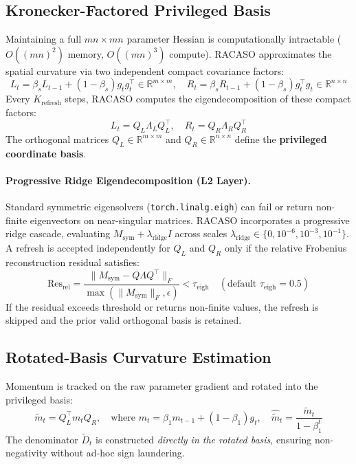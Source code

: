 \documentclass[11pt,a4paper]{article}
\begin{document}
\subsection{Kronecker-Factored Privileged Basis}

Maintaining a full $mn \times mn$ parameter Hessian is computationally intractable ($O((mn)^2)$ memory, $O((mn)^3)$ compute). RACASO approximates the spatial curvature via two independent compact covariance factors:
\begin{equation}
L_t = \beta_s L_{t-1} + (1 - \beta_s) g_t g_t^\top \in \mathbb{R}^{m \times m}, \quad R_t = \beta_s R_{t-1} + (1 - \beta_s) g_t^\top g_t \in \mathbb{R}^{n \times n}
\end{equation}
Every $K_{\text{refresh}}$ steps, RACASO computes the eigendecomposition of these compact factors:
\begin{equation}
L_t = Q_L \Lambda_L Q_L^\top, \quad R_t = Q_R \Lambda_R Q_R^\top
\end{equation}
The orthogonal matrices $Q_L \in \mathbb{R}^{m \times m}$ and $Q_R \in \mathbb{R}^{n \times n}$ define the \textbf{privileged coordinate basis}.

\paragraph{Progressive Ridge Eigendecomposition (L2 Layer).}
Standard symmetric eigensolvers (\texttt{torch.linalg.eigh}) can fail or return non-finite eigenvectors on near-singular matrices. RACASO incorporates a progressive ridge cascade, evaluating $M_{\text{sym}} + \lambda_{\text{ridge}} I$ across scales $\lambda_{\text{ridge}} \in \{0, 10^{-6}, 10^{-3}, 10^{-1}\}$. A refresh is accepted independently for $Q_L$ and $Q_R$ only if the relative Frobenius reconstruction residual satisfies:
\begin{equation}
\text{Res}_{\text{rel}} = \frac{\|M_{\text{sym}} - Q \Lambda Q^\top\|_F}{\max(\|M_{\text{sym}}\|_F, \epsilon)} < \tau_{\text{eigh}} \quad (\text{default } \tau_{\text{eigh}} = 0.5)
\end{equation}
If the residual exceeds threshold or returns non-finite values, the refresh is skipped and the prior valid orthogonal basis is retained.

\subsection{Rotated-Basis Curvature Estimation}

Momentum is tracked on the raw parameter gradient and rotated into the privileged basis:
\begin{equation}
\tilde{m}_t = Q_L^\top m_t Q_R, \quad \text{where } m_t = \beta_1 m_{t-1} + (1 - \beta_1) g_t, \quad \hat{\tilde{m}}_t = \frac{\tilde{m}_t}{1 - \beta_1^t}
\end{equation}
The denominator $\tilde{D}_t$ is constructed \emph{directly in the rotated basis}, ensuring non-negativity without ad-hoc sign laundering.
\end{document}
